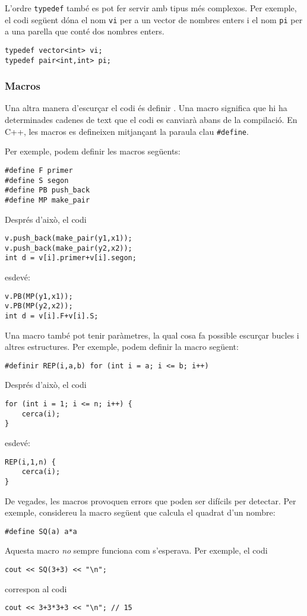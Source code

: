 L'ordre \texttt{typedef}
també es pot fer servir amb tipus més complexos.
Per exemple, el codi següent dóna
el nom \texttt{vi} per a un vector de nombres enters
i el nom \texttt{pi} per a una parella
que conté dos nombres enters.
\begin{lstlisting}
typedef vector<int> vi;
typedef pair<int,int> pi;
\end{lstlisting}

\subsubsection{Macros}
Una altra manera d'escurçar el codi és definir
.
Una macro significa que hi ha determinades cadenes
de text que el codi es canviarà abans de la compilació.
En C++, les macros es defineixen mitjançant la paraula
clau \texttt{\#define}.

Per exemple, podem definir les macros següents:
\begin{lstlisting}
#define F primer
#define S segon
#define PB push_back
#define MP make_pair
\end{lstlisting}
Després d'això, el codi
\begin{lstlisting}
v.push_back(make_pair(y1,x1));
v.push_back(make_pair(y2,x2));
int d = v[i].primer+v[i].segon;
\end{lstlisting}
esdev\'e:
\begin{lstlisting}
v.PB(MP(y1,x1));
v.PB(MP(y2,x2));
int d = v[i].F+v[i].S;
\end{lstlisting}

Una macro també pot tenir paràmetres,
la qual cosa fa possible escurçar bucles i altres
estructures.
Per exemple, podem definir la macro següent:
\begin{lstlisting}
#definir REP(i,a,b) for (int i = a; i <= b; i++)
\end{lstlisting}
Després d'això, el codi
\begin{lstlisting}
for (int i = 1; i <= n; i++) {
    cerca(i);
}
\end{lstlisting}
esdev\'e:
\begin{lstlisting}
REP(i,1,n) {
    cerca(i);
}
\end{lstlisting}

De vegades, les macros provoquen errors que poden ser difícils
per detectar. Per exemple, considereu la macro següent
que calcula el quadrat d'un nombre:
\begin{lstlisting}
#define SQ(a) a*a
\end{lstlisting}
Aquesta macro \emph{no} sempre funciona com s'esperava.
Per exemple, el codi
\begin{lstlisting}
cout << SQ(3+3) << "\n";
\end{lstlisting}
correspon al codi
\begin{lstlisting}
cout << 3+3*3+3 << "\n"; // 15
\end{lstlisting}

